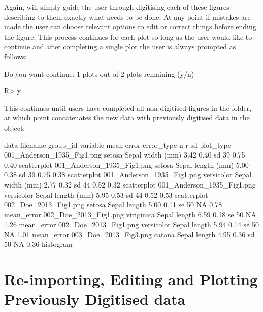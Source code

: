 \documentclass[article]{jss}
\newcommand{\fct}[1]{\code{#1()}}
\begin{document}
Again, \fct{metaDigitise} will simply guide the user through digitising each of these figures describing to them exactly what needs to be done. At any point if mistakes are made the user can choose relevant options to edit or correct things before ending the figure. This process continues for each plot so long as the user would like to continue and after completing a single plot the user is always prompted as follows:

\begin{CodeChunk}
\begin{CodeOutput}
Do you want continue: 1 plots out of 2 plots remaining (y/n)
\end{CodeOutput}
\begin{CodeInput}
R> y
\end{CodeInput}
\end{CodeChunk}

This continues until users have completed all non-digitised figures in the folder, at which point \fct{metaDigitise} concatenates the new data with previously digitised data in the object:

\begin{CodeChunk}
{\scriptsize
\begin{CodeOutput}
data
                  filename    group_id         variable   mean  error error_type n    r    sd   plot_type
001_Anderson_1935_Fig1.png      setosa  Sepal width (mm)  3.42  0.40  sd        39  0.75  0.40  scatterplot
001_Anderson_1935_Fig1.png      setosa  Sepal length (mm) 5.00  0.38  sd        39  0.75  0.38  scatterplot
001_Anderson_1935_Fig1.png  versicolor  Sepal width (mm)  2.77  0.32  sd        44  0.52  0.32  scatterplot
001_Anderson_1935_Fig1.png  versicolor  Sepal length (mm) 5.95  0.53  sd        44  0.52  0.53  scatterplot
     002_Doe_2013_Fig1.png      setosa  Sepal length      5.00  0.11  se        50  NA    0.78  mean_error
     002_Doe_2013_Fig1.png  viriginica  Sepal length      6.59  0.18  se        50  NA    1.26  mean_error
     002_Doe_2013_Fig1.png  versicolor  Sepal length      5.94  0.14  se        50  NA    1.01  mean_error
     003_Doe_2013_Fig3.png      catana  Sepal length      4.95  0.36  sd        50  NA    0.36  histogram
\end{CodeOutput}
}
\end{CodeChunk}


\section{Re-importing, Editing and Plotting Previously Digitised data}
\end{document}
